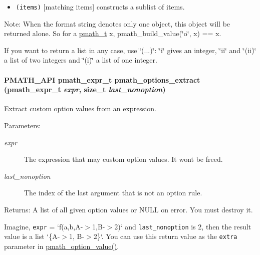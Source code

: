 \begin{itemize}
\item {\tt (items)} \mbox{[}matching items\mbox{]} constructs a sublist of items.\end{itemize}


\begin{Desc}
\item[Note:]When the format string denotes only one object, this object will be returned alone. So for a \hyperlink{classpmath__t}{pmath\_\-t} x, pmath\_\-build\_\-value(\char`\"{}o\char`\"{}, x) == x. \par
 If you want to return a list in any case, use \char`\"{}(...)\char`\"{}: \char`\"{}i\char`\"{} gives an integer, \char`\"{}ii\char`\"{} and \char`\"{}(ii)\char`\"{} a list of two integers and \char`\"{}(i)\char`\"{} a list of one integer. \end{Desc}
\hypertarget{group__helpers_g24403dfbd825b17fc4c6da5973922184}{
\paragraph[{pmath\_\-options\_\-extract}]{\setlength{\rightskip}{0pt plus 5cm}PMATH\_\-API {\bf pmath\_\-expr\_\-t} pmath\_\-options\_\-extract ({\bf pmath\_\-expr\_\-t} {\em expr}, \/  size\_\-t {\em last\_\-nonoption})}\hfill}
\label{group__helpers_g24403dfbd825b17fc4c6da5973922184}


Extract custom option values from an expression. 

\begin{Desc}
\item[Parameters:]
\begin{description}
\item[{\em expr}]The expression that may custom option values. It wont be freed. \item[{\em last\_\-nonoption}]The index of the last argument that is not an option rule. \end{description}
\end{Desc}
\begin{Desc}
\item[Returns:]A list of all given option values or NULL on error. You must destroy it.\end{Desc}
Imagine, {\tt expr} = `f(a,b,A-$>$1,B-$>$2)` and {\tt last\_\-nonoption} is 2, then the result value is a list `\{A-$>$1, B-$>$2\}`. You can use this return value as the {\tt extra} parameter in \hyperlink{group__helpers_gc244ab0720278b396976728a39f8bde6}{pmath\_\-option\_\-value()}.

